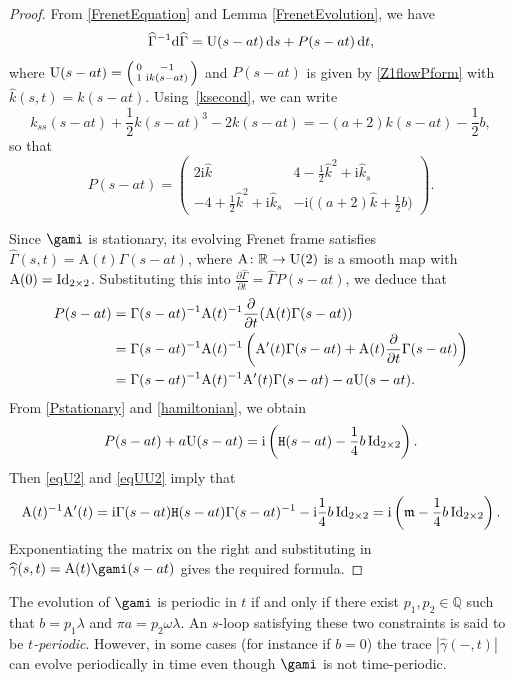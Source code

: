 \documentclass[10pt,a4paper]{amsart}
\newcommand\kk{k} %
\def\ri{\mathrm{i}}
\newcommand{\ds}{\,{\rm d}s}
\def\gam{\gamma} %
\def\di{\partial}
\def\R{\mathbb R}
\newcommand\gamf{\widehat{\gam}} %
\newcommand\Gamf{\widehat{\Gamma}} %
\newcommand\kh{\widehat{\kk}} %
\newcommand\rA{\mathrm{A}}
\numberwithin{equation}{section}
\begin{document}
\begin{proof} From \eqref{FrenetEquation} and Lemma \ref{FrenetEvolution}, we have
\[\Gamf^{-1}  {\rm d}\Gamf = {\rm U}(s-at)\ds + P(s-at)\, {\rm d}t,\]
where ${\rm U}(s-at) = \left( \begin{smallmatrix} 0 & -1 \\ 1 & \ri k(s-at) \end{smallmatrix} \right)$ and $
P(s-at)$ is given by \eqref{Z1flowPform} with $\kh(s,t) = k(s-at)$.
Using~\eqref{ksecond}, we can write
\[\kk_{ss}(s-at)+\frac12 \kk(s-at)^3-2\kk(s-at)=-(a+2)\kk(s-at)-\frac12 b,\]
so that
\begin{equation}\label{Pstationary}
P(s-a t) =
\begin{pmatrix} 2\ri \kh & 4-\tfrac12 \kh^2 +\ri \kh_s \\
-4+\tfrac12 \kh^2 + \ri \kh_s & -\ri\bigl((a+2)\kh+\tfrac12{b}\bigr) \end{pmatrix}.
\end{equation}

Since $\gami$ is stationary, its evolving Frenet frame satisfies $\Gamf(s,t)=\rA(t) \Gamma(s-at)$, where
${\rA\colon\R\to {\rm U}(2)}$ is a smooth map with $\rA(0)={\rm Id}_{2\times 2}$.
Substituting this into $\frac{\partial \Gamf}{\partial t} = \Gamf P(s-at)$, we deduce that
\begin{align}
P(s-at)={}& \Gamma(s-at)^{-1} \rA(t)^{-1}\frac{\di}{\di t} (\rA(t) \Gamma(s-at))\nonumber\\
={}&\Gamma(s-at)^{-1} \rA(t)^{-1}\left(\rA'(t)  \Gamma(s-at)+\rA(t) \frac{\di}{\di t} \Gamma(s-at)\right)\nonumber\\
={}&\Gamma(s-at)^{-1} \rA(t)^{-1} \rA'(t) \Gamma(s-at) -a {\rm U}(s-at).\label{eqU2}
\end{align}
From \eqref{Pstationary} and \eqref{hamiltonian}, we obtain
\begin{equation}\label{eqUU2} P(s-at)+a {\rm U}(s-at)=\ri \left({\mathtt H}(s-at)-\frac14 b\,{\rm Id}_{2\times 2}\right).\end{equation}
Then \eqref{eqU2} and \eqref{eqUU2} imply that
\[ \rA(t)^{-1} \rA'(t) =\ri \Gamma(s-at) {\mathtt H}(s-at) \Gamma(s-a t)^{-1}
-\ri \frac14 b\,{\rm Id}_{2\times 2}= \ri \left({\mathfrak m}-\frac14{b}\,{\rm Id}_{2\times 2}\right).\]
Exponentiating the matrix on the right and substituting in $\gamf(s,t) = \rA(t) \gami(s-a t)$ gives the required formula.
\end{proof}

\begin{Remark} \label{timeevolution2} The evolution of $\gami$ is periodic in $t$ if and only if there exist $p_1,p_2\in {\mathbb Q}$ such that $b=p_1\lambda$ and
 $\pi a= p_2\omega\lambda$. An $s$-loop satisfying these two constraints is said to be {\it $t$-periodic}. However, in some cases (for instance if $b=0$) the trace $|\gamf(-,t)|$ can evolve periodically in time even though $\gami$ is not time-periodic.
\end{Remark}
\end{document}
